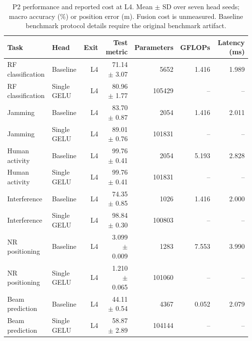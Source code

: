 \begin{table}[t]
\centering
\caption{P2 performance and reported cost at L4. Mean $\pm$ SD over seven head seeds; macro accuracy (\%) or position error (m). Fusion cost is unmeasured. Baseline benchmark protocol details require the original benchmark artifact.}
\begin{tabular}{llrrrrr}
\hline
Task & Head & Exit & Test metric & Parameters & GFLOPs & Latency (ms) \\
\hline
RF classification & Baseline & L4 & 71.14 $\pm$ 3.07 & 5652 & 1.416 & 1.989 \\
RF classification & Single GELU & L4 & 80.96 $\pm$ 1.77 & 105429 & -- & -- \\
Jamming & Baseline & L4 & 83.70 $\pm$ 0.87 & 2054 & 1.416 & 2.011 \\
Jamming & Single GELU & L4 & 89.01 $\pm$ 0.76 & 101831 & -- & -- \\
Human activity & Baseline & L4 & 99.76 $\pm$ 0.41 & 2054 & 5.193 & 2.828 \\
Human activity & Single GELU & L4 & 99.76 $\pm$ 0.41 & 101831 & -- & -- \\
Interference & Baseline & L4 & 74.35 $\pm$ 0.85 & 1026 & 1.416 & 2.000 \\
Interference & Single GELU & L4 & 98.84 $\pm$ 0.30 & 100803 & -- & -- \\
NR positioning & Baseline & L4 & 3.099 $\pm$ 0.009 & 1283 & 7.553 & 3.990 \\
NR positioning & Single GELU & L4 & 1.210 $\pm$ 0.065 & 101060 & -- & -- \\
Beam prediction & Baseline & L4 & 44.11 $\pm$ 0.54 & 4367 & 0.052 & 2.079 \\
Beam prediction & Single GELU & L4 & 58.87 $\pm$ 2.89 & 104144 & -- & -- \\
\hline
\end{tabular}
\end{table}
